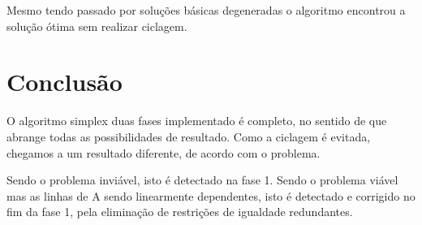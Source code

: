 \documentclass[
	12pt,				%
	openright,			%
	oneside,			%
	a4paper,			%
	english,			%
	french,				%
	spanish,			%
	brazil,				%
	]{abntex2}
\begin{document}
Mesmo tendo passado por soluções básicas degeneradas o algoritmo encontrou a solução ótima sem realizar ciclagem.
%
%
%
%

%

\chapter*[Conclusão]{Conclusão}



O algoritmo simplex duas fases implementado é completo, no sentido de que abrange todas as possibilidades de resultado. Como a ciclagem é evitada, chegamos a um resultado diferente, de acordo com o problema.

Sendo o problema inviável, isto é detectado na fase 1. Sendo o problema viável mas as linhas de A sendo linearmente dependentes, isto é detectado e corrigido no fim da fase 1, pela eliminação de restrições de igualdade redundantes.
\end{document}
